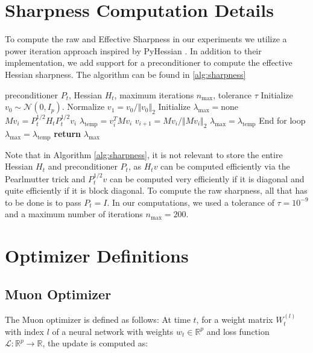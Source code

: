 \documentclass{article}
\theoremstyle{plain}
\theoremstyle{definition}
\theoremstyle{remark}
\begin{document}
\section{Sharpness Computation Details}

To compute the raw and Effective Sharpness in our experiments we utilize a power iteration approach inspired by PyHessian \cite{yao2020pyhessian}. In addition to their implementation, we add support for a preconditioner to compute the effective Hessian sharpness. The algorithm can be found in \ref{alg:sharpness}

\begin{algorithm}[ht]
   \caption{Sharpness Power Iteration}
   \label{alg:sharpness}
\begin{algorithmic}
    preconditioner $P_t$, Hessian $H_t$, maximum iterations $n_\text{max}$, tolerance $\tau$
   \STATE Initialize $v_0 \sim \mathcal{N}(0, I_p)$.
   \STATE Normalize $v_1 = v_0 / \Vert v_0 \Vert_2$
   \STATE Initialize $\lambda_\text{max} = \text{none}$
   \STATE $Mv_i = P_t^{1/2}H_tP_t^{1/2}v_i$
   \STATE $\lambda_\text{temp} = v_i^TMv_i$
   \STATE $v_{i+1} = Mv_i / \Vert Mv_i \Vert_2$
   \STATE $\lambda_\text{max} = \lambda_\text{temp}$
   \STATE End for loop
   \ENDIF
   \STATE $\lambda_\text{max} = \lambda_\text{temp}$
   \ENDFOR
   \STATE \textbf{return} $\lambda_\text{max}$
\end{algorithmic}
\end{algorithm}

Note that in Algorithm \ref{alg:sharpness}, it is not relevant to store the entire Hessian $H_t$ and preconditioner $P_t$, as $H_tv$ can be computed efficiently via the Pearlmutter trick and $P^{1/2}_tv$ can be computed very efficiently if it is diagonal and quite efficiently if it is block diagonal. To compute the raw sharpness, all that has to be done is to pass $P_t = I$. In our computations, we used a tolerance of $\tau = 10^{-9}$ and a maximum number of iterations $n_\text{max} = 200$.

\section{Optimizer Definitions} \label{app:optims}

\subsection{Muon Optimizer}
The Muon optimizer \cite{jordan2024muon} is defined as follows: At time $t$, for a weight matrix $W_t^{(l)}$ with index $l$ of a neural network with weights $w_t \in \mathbb{R}^p$ and loss function $\mathcal{L}: \mathbb{R}^p \rightarrow \mathbb{R}$, the update is computed as:
\end{document}
